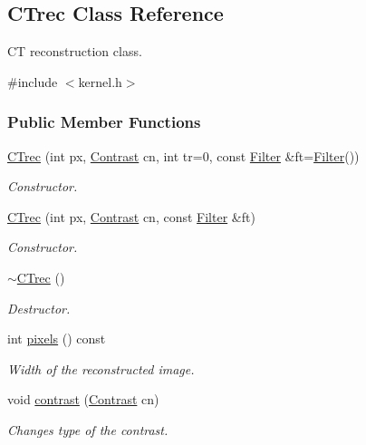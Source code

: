 \hypertarget{classCTrec}{
\subsection{CTrec Class Reference}
\label{classCTrec}
}


CT reconstruction class.  




{\ttfamily \#include $<$kernel.h$>$}

\subsubsection*{Public Member Functions}
\begin{DoxyCompactItemize}
\item 
\hyperlink{classCTrec_a600b06fc54845a8bbff34ec2cfe10dc9}{CTrec} (int px, \hyperlink{classContrast}{Contrast} cn, int tr=0, const \hyperlink{classFilter}{Filter} \&ft=\hyperlink{classFilter}{Filter}())
\begin{DoxyCompactList}\small\item\em Constructor. \item\end{DoxyCompactList}\item 
\hyperlink{classCTrec_a8399e98e0f873fbacd2c19d954d1ee2b}{CTrec} (int px, \hyperlink{classContrast}{Contrast} cn, const \hyperlink{classFilter}{Filter} \&ft)
\begin{DoxyCompactList}\small\item\em Constructor. \item\end{DoxyCompactList}\item 
\hyperlink{classCTrec_aa645497b42cbb9faa801b54e00ab8912}{$\sim$CTrec} ()
\begin{DoxyCompactList}\small\item\em Destructor. \item\end{DoxyCompactList}\item 
int \hyperlink{classCTrec_a8035ba4ea418a79cba3f56e42a85cfb1}{pixels} () const 
\begin{DoxyCompactList}\small\item\em Width of the reconstructed image. \item\end{DoxyCompactList}\item 
void \hyperlink{classCTrec_ab0bda30e0ff6585f13cfefe00cf1ee5e}{contrast} (\hyperlink{classContrast}{Contrast} cn)
\begin{DoxyCompactList}\small\item\em Changes type of the contrast. \item\end{DoxyCompactList}\item 

\end{DoxyCompactItemize}
